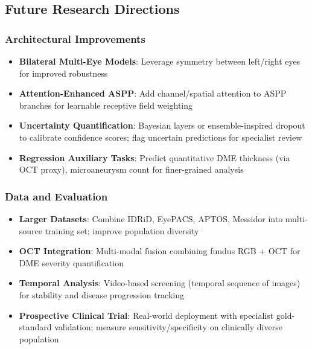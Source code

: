 \subsection{Future Research Directions}

\subsubsection{Architectural Improvements}

\begin{itemize}
    \item \textbf{Bilateral Multi-Eye Models}: Leverage symmetry between left/right eyes for improved robustness
    
    \item \textbf{Attention-Enhanced ASPP}: Add channel/spatial attention to ASPP branches for learnable receptive field weighting
    
    \item \textbf{Uncertainty Quantification}: Bayesian layers or ensemble-inspired dropout to calibrate confidence scores; flag uncertain predictions for specialist review
    
    \item \textbf{Regression Auxiliary Tasks}: Predict quantitative DME thickness (via OCT proxy), microaneurysm count for finer-grained analysis
\end{itemize}

\subsubsection{Data and Evaluation}

\begin{itemize}
    \item \textbf{Larger Datasets}: Combine IDRiD, EyePACS, APTOS, Messidor into multi-source training set; improve population diversity
    
    \item \textbf{OCT Integration}: Multi-modal fusion combining fundus RGB + OCT for DME severity quantification
    
    \item \textbf{Temporal Analysis}: Video-based screening (temporal sequence of images) for stability and disease progression tracking
    
    \item \textbf{Prospective Clinical Trial}: Real-world deployment with specialist gold-standard validation; measure sensitivity/specificity on clinically diverse population
\end{itemize}

